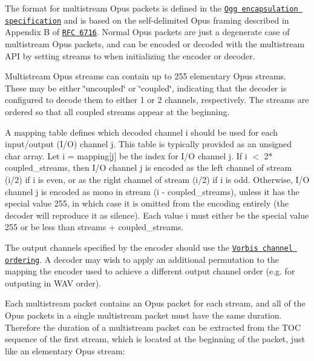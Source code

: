 The format for multistream Opus packets is defined in the \href{http://tools.ietf.org/html/draft-terriberry-oggopus}{\tt Ogg encapsulation specification} and is based on the self-\/delimited Opus framing described in Appendix B of \href{http://tools.ietf.org/html/rfc6716}{\tt RFC 6716}. Normal Opus packets are just a degenerate case of multistream Opus packets, and can be encoded or decoded with the multistream API by setting {\ttfamily streams} to {} when initializing the encoder or decoder.

Multistream Opus streams can contain up to 255 elementary Opus streams. These may be either \char`\"{}uncoupled\char`\"{} or \char`\"{}coupled\char`\"{}, indicating that the decoder is configured to decode them to either 1 or 2 channels, respectively. The streams are ordered so that all coupled streams appear at the beginning.

A {\ttfamily mapping} table defines which decoded channel {\ttfamily i} should be used for each input/output (I/O) channel {\ttfamily j}. This table is typically provided as an unsigned char array. Let {\ttfamily i = mapping\mbox{[}j\mbox{]}} be the index for I/O channel {\ttfamily j}. If {\ttfamily i $<$ 2$\ast$coupled\_\-streams}, then I/O channel {\ttfamily j} is encoded as the left channel of stream {\ttfamily (i/2)} if {\ttfamily i} is even, or as the right channel of stream {\ttfamily (i/2)} if {\ttfamily i} is odd. Otherwise, I/O channel {\ttfamily j} is encoded as mono in stream {\ttfamily (i -\/ coupled\_\-streams)}, unless it has the special value 255, in which case it is omitted from the encoding entirely (the decoder will reproduce it as silence). Each value {\ttfamily i} must either be the special value 255 or be less than {\ttfamily streams + coupled\_\-streams}.

The output channels specified by the encoder should use the \href{http://www.xiph.org/vorbis/doc/Vorbis_I_spec.html#x1-800004.3.9}{\tt Vorbis channel ordering}. A decoder may wish to apply an additional permutation to the mapping the encoder used to achieve a different output channel order (e.g. for outputing in WAV order).

Each multistream packet contains an Opus packet for each stream, and all of the Opus packets in a single multistream packet must have the same duration. Therefore the duration of a multistream packet can be extracted from the TOC sequence of the first stream, which is located at the beginning of the packet, just like an elementary Opus stream:


